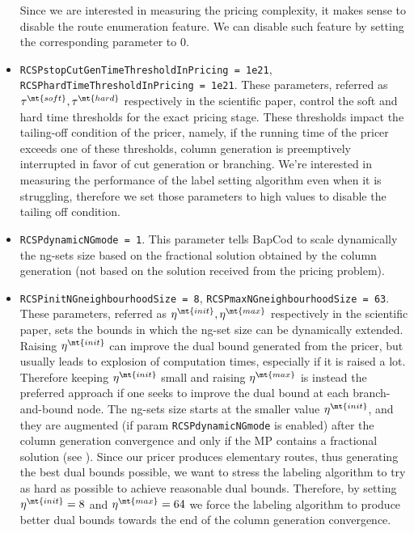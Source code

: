 \begin{itemize}
	      Since we are interested in measuring the pricing complexity, it makes sense to disable the route enumeration feature.
	      We can disable such feature by setting the corresponding parameter to $0$.
	\item \texttt{RCSPstopCutGenTimeThresholdInPricing = 1e21}, \texttt{RCSPhardTimeThresholdInPricing = 1e21}.
	      These parameters, referred as $\tau^\mt{soft}, \tau^\mt{hard}$ respectively in the scientific paper,
	      control the soft and hard time thresholds for the exact pricing stage.
	      These thresholds impact the tailing-off condition of the pricer, namely, if the running time of the pricer exceeds one of these thresholds, column generation is preemptively interrupted in favor of cut generation or branching.
	      We're interested in measuring the performance of the label setting algorithm even when it is struggling, therefore we set those parameters to high values to disable the tailing off condition.
	\item \texttt{RCSPdynamicNGmode = 1}.
	      This parameter tells BapCod to scale dynamically
	      the ng-sets size based on the
	      fractional solution obtained by the column generation
	      (not based on the solution received from the pricing problem).
	\item \texttt{RCSPinitNGneighbourhoodSize = 8}, \texttt{RCSPmaxNGneighbourhoodSize = 63}.
	      These parameters, referred as $\eta^\mt{init}, \eta^\mt{max}$ respectively in the scientific paper,
	      sets the bounds in which the ng-set size can be dynamically extended.
	      Raising $\eta^\mt{init}$ can improve the dual bound generated from the pricer, but usually leads to explosion of computation times, especially if it is raised a lot.
	      Therefore keeping $\eta^\mt{init}$ small and raising $\eta^\mt{max}$ is instead the preferred approach if one seeks to improve the dual bound at each branch-and-bound node.
	      The ng-sets size starts at the smaller value $\eta^\mt{init}$, and they are augmented (if param \texttt{RCSPdynamicNGmode} is enabled)
	      after the column generation convergence and only if the MP contains a fractional solution (see \cite{pessoa2020a}).
	      Since our pricer produces elementary routes, thus generating the best dual bounds possible, we want to stress the labeling algorithm to try as hard as possible to achieve
	      reasonable dual bounds. Therefore, by setting $\eta^\mt{init} = 8$ and $\eta^\mt{max} = 64$ we force the labeling algorithm to produce better dual bounds towards the end
	      of the column generation convergence.

\end{itemize}
